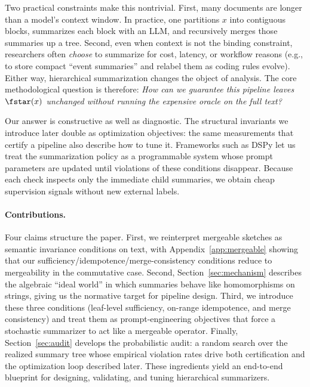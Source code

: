Two practical constraints make this nontrivial. First, many documents are longer than a model's context window. In practice, one partitions $x$ into contiguous blocks, summarizes each block with an LLM, and recursively merges those summaries up a tree. Second, even when context is not the binding constraint, researchers often \emph{choose} to summarize for cost, latency, or workflow reasons (e.g., to store compact ``event summaries'' and relabel them as coding rules evolve). Either way, hierarchical summarization changes the object of analysis. The core methodological question is therefore: \emph{How can we guarantee this pipeline leaves $\fstar(x)$ unchanged without running the expensive oracle on the full text?}

Our answer is constructive as well as diagnostic. The structural invariants we introduce later double as optimization objectives: the same measurements that certify a pipeline also describe how to tune it. Frameworks such as DSPy \citep{khattab2024dspy} let us treat the summarization policy as a programmable system whose prompt parameters are updated until violations of these conditions disappear. Because each check inspects only the immediate child summaries, we obtain cheap supervision signals without new external labels.

\paragraph{Contributions.} Four claims structure the paper. First, we reinterpret mergeable sketches \citep{agarwal2013mergeable} as semantic invariance conditions on text, with Appendix~\ref{app:mergeable} showing that our sufficiency/idempotence/merge-consistency conditions reduce to mergeability in the commutative case. Second, Section~\ref{sec:mechanism} describes the algebraic ``ideal world'' in which summaries behave like homomorphisms on strings, giving us the normative target for pipeline design. Third, we introduce these three conditions (leaf-level sufficiency, on-range idempotence, and merge consistency) and treat them as prompt-engineering objectives that force a stochastic summarizer to act like a mergeable operator. Finally, Section~\ref{sec:audit} develops the probabilistic audit: a random search over the realized summary tree whose empirical violation rates drive both certification and the optimization loop described later. These ingredients yield an end-to-end blueprint for designing, validating, and tuning hierarchical summarizers.

